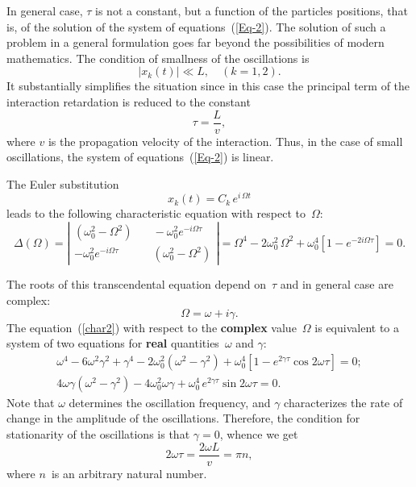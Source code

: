 \documentclass[a4,%
amsmath,amssymb,
12pt
]{revtex4-1}
\begin{document}
In general case, $\tau$ is not a constant, but a function of the particles positions, that is, of the solution of the system of equations~(\ref{Eq-2}). The solution of such a problem in a general formulation goes far beyond the possibilities of modern mathematics.
%
The condition of smallness of the oscillations is 
\begin{equation}\label{small}
\left| x_k\left(t \right) \right| \ll L, \quad (k=1, 2). 
\end{equation} 
It substantially simplifies the situation since in this case the principal term of the interaction retardation is reduced to the constant
\begin{equation}\label{tau}
\tau = \frac{L}{v},
\end{equation}
where $v$ is the propagation velocity of the interaction. Thus, in the case of small oscillations, the system of equations~(\ref{Eq-2}) is linear.

The Euler substitution 
\begin{equation}\label{Euler}
x_k\left(t \right)  = C_k\, e^{i\, \Omega t}
\end{equation}
leads to the following characteristic equation with respect to~$ \Omega $:
\begin{equation}\label{char2}
\Delta \left(\Omega \right) = \left| 
\begin{array}{cc}
\left( \omega_0 ^2 - \Omega^2\right) & \quad - \omega_0 ^2 e^{-i\Omega\tau}\\
- \omega_0 ^2  e^{-i\Omega\tau} & \quad \left( \omega_0 ^2 - \Omega^2\right)
\end{array}
\right| =   \Omega^4 -2 \omega_0^2\,\Omega^2 +\omega_0^4\left[1-e^{-2i\Omega\tau} \right] = 0.
\end{equation}

The roots of this transcendental equation depend on~$ \tau $ and in general case are complex:
\begin{equation}\label{Im-alpha}
\Omega = \omega +i\gamma.
\end{equation}
The equation~(\ref {char2}) with respect to the \textbf {complex} value~$ \Omega $ is equivalent to a system of two equations for \textbf{real} quantities~$ \omega $ and $ \gamma $:
%
\begin{eqnarray}
{\displaystyle  \omega^4 - 6\omega^2 \gamma^2+\gamma^4- 2 \omega_0^2\left( \omega^2 - \gamma^2\right) +\omega_0^4\left[1-e^{2\gamma\tau} \cos{2\omega\tau }\right]  =0; }\label{ab} \\
{\displaystyle 4\omega \gamma\left(\omega^2-\gamma^2 \right) -4\omega_0^2 \omega \gamma + \omega_0^4\, e^{2\gamma\tau } \sin{2\omega\tau }=0.}\label{ba}
\end{eqnarray}
%
%
Note that $ \omega $ determines the oscillation frequency, and $ \gamma $ characterizes the rate of change in the amplitude of the oscillations. Therefore, the condition for stationarity of the oscillations is that $ \gamma=0 $, whence we get 
\begin{equation}\label{b=0}
2\omega\tau = \frac{2\omega L}{v} = \pi n,
\end{equation}
where $n$~is an arbitrary natural number. 
\end{document}
